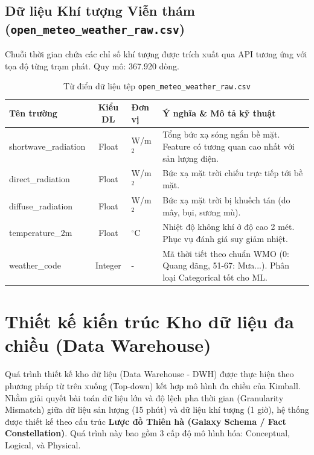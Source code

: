 \documentclass[12pt, a4paper]{report}
\begin{document}
\subsection{Dữ liệu Khí tượng Viễn thám (\texttt{open\_meteo\_weather\_raw.csv})}
Chuỗi thời gian chứa các chỉ số khí tượng được trích xuất qua API tương ứng với tọa độ từng trạm phát. Quy mô: 367.920 dòng.
\begin{table}[H]
\centering
\caption{Từ điển dữ liệu tệp \texttt{open\_meteo\_weather\_raw.csv}}
\renewcommand{\arraystretch}{1.4}
\begin{tabularx}{\textwidth}{p{3.8cm} c p{2cm} X}
\toprule
\textbf{Tên trường} & \textbf{Kiểu DL} & \textbf{Đơn vị} & \textbf{Ý nghĩa \& Mô tả kỹ thuật} \\
\midrule
shortwave\_radiation & Float   & W/m$^2$ & Tổng bức xạ sóng ngắn bề mặt. Feature có tương quan cao nhất với sản lượng điện. \\
direct\_radiation    & Float   & W/m$^2$ & Bức xạ mặt trời chiếu trực tiếp tới bề mặt. \\
diffuse\_radiation   & Float   & W/m$^2$ & Bức xạ mặt trời bị khuếch tán (do mây, bụi, sương mù). \\
temperature\_2m      & Float   & $^\circ$C & Nhiệt độ không khí ở độ cao 2 mét. Phục vụ đánh giá suy giảm nhiệt. \\
weather\_code        & Integer & -       & Mã thời tiết theo chuẩn WMO (0: Quang đãng, 51-67: Mưa...). Phân loại Categorical tốt cho ML. \\
\bottomrule
\end{tabularx}
\end{table}
\section{Thiết kế kiến trúc Kho dữ liệu đa chiều (Data Warehouse)}
\label{sec:star_schema}

Quá trình thiết kế kho dữ liệu (Data Warehouse - DWH) được thực hiện theo phương pháp từ trên xuống (Top-down) kết hợp mô hình đa chiều của Kimball. Nhằm giải quyết bài toán dữ liệu lớn và độ lệch pha thời gian (Granularity Mismatch) giữa dữ liệu sản lượng (15 phút) và dữ liệu khí tượng (1 giờ), hệ thống được thiết kế theo cấu trúc \textbf{Lược đồ Thiên hà (Galaxy Schema / Fact Constellation)}. Quá trình này bao gồm 3 cấp độ mô hình hóa: Conceptual, Logical, và Physical.
\end{document}
